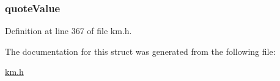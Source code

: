 \subsubsection[{\texorpdfstring{quote\+Value}{quoteValue}}]{ quote\+Value}\hypertarget{struct_k_1_1m_position_aa18e1bafbe0751bf4ba417df1da264d9}{}\label{struct_k_1_1m_position_aa18e1bafbe0751bf4ba417df1da264d9}


Definition at line 367 of file km.\+h.



The documentation for this struct was generated from the following file\+:\begin{DoxyCompactItemize}
\item 
\hyperlink{km_8h}{km.\+h}\end{DoxyCompactItemize}
